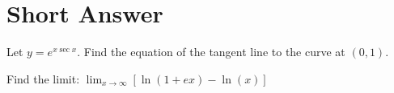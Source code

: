 \documentclass[12pt]{amsart}
\begin{document}
\section*{Short Answer}

\begin{thm}[6 Points]
  Let \(\displaystyle{y=e^{x\sec x}}\).  Find the equation of the tangent line to the curve at \((0,1)\).
\end{thm}

\vspace{3in}

\begin{thm}[6 Points]
  Find the limit: \(\displaystyle{\lim_{x\rightarrow\infty}\left[\ln(1+ex)-\ln(x)\right]}\)
\end{thm}

\newpage
\end{document}
